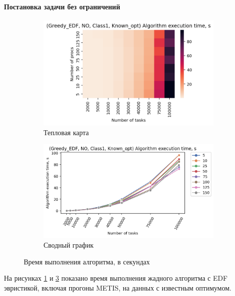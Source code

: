 \paragraph{Постановка задачи без ограничений}

\begin{figure}[!htbp]
    \centering
    \begin{subfigure}{0.49\textwidth}
        \includegraphics[width=\textwidth]{imgs/ideal_1/NO_EDF/et_heatmap.png}
        \caption{Тепловая карта}
        \label{fig:NO-EDF-exec-time-heatmap}
    \end{subfigure}
    \hfill
    \begin{subfigure}{0.49\textwidth}
        \includegraphics[width=\textwidth]{imgs/ideal_1/NO_EDF/tr_graph.png}
        \caption{Сводный график}
        \label{fig:NO-EDF-exec-time-compiled}
    \end{subfigure}
    \caption{Время выполнения алгоритма, в секундах}
\end{figure}

На рисунках \ref{fig:NO-EDF-exec-time-heatmap} и \ref{fig:NO-EDF-exec-time-compiled} показано время выполнения жадного алгоритма с EDF эвристикой, включая прогоны METIS, на данных с известным оптимумом.

